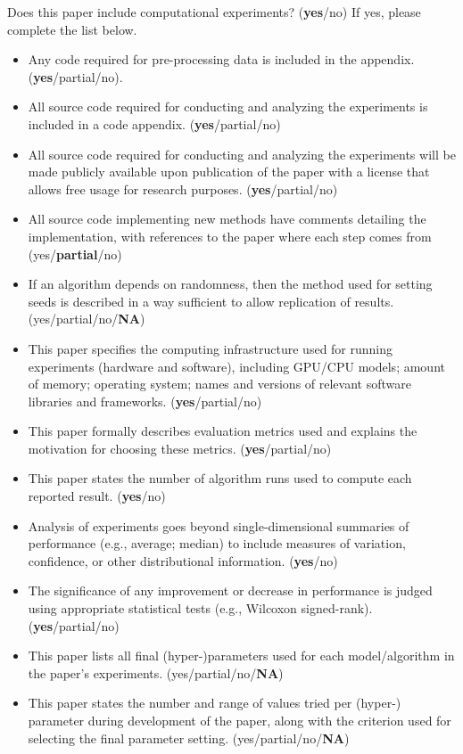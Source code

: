 \documentclass[letterpaper]{article} %
\theoremstyle{remark}
\theoremstyle{definition}
\begin{document}
Does this paper include computational experiments? (\textbf{yes}/no) If yes,
please complete the list below.

\begin{itemize}
  \item Any code required for pre-processing data is included in the appendix.
        (\textbf{yes}/partial/no).
  \item All source code required for conducting and analyzing the experiments is
        included in a code appendix. (\textbf{yes}/partial/no)
  \item All source code required for conducting and analyzing the experiments
        will be made publicly available upon publication of the paper with a
        license that allows free usage for research purposes.
        (\textbf{yes}/partial/no)
  \item All source code implementing new methods have comments detailing the
        implementation, with references to the paper where each step comes from
        (yes/\textbf{partial}/no)
  \item If an algorithm depends on randomness, then the method used for setting
        seeds is described in a way sufficient to allow replication of results.
        (yes/partial/no/\textbf{NA})
  \item This paper specifies the computing infrastructure used for running
        experiments (hardware and software), including GPU/CPU models; amount of
        memory; operating system; names and versions of relevant software
        libraries and frameworks. (\textbf{yes}/partial/no)
  \item This paper formally describes evaluation metrics used and explains the
        motivation for choosing these metrics. (\textbf{yes}/partial/no)
  \item This paper states the number of algorithm runs used to compute each
        reported result. (\textbf{yes}/no)
  \item Analysis of experiments goes beyond single-dimensional summaries of
        performance (e.g., average; median) to include measures of variation,
        confidence, or other distributional information. (\textbf{yes}/no)
  \item The significance of any improvement or decrease in performance is judged
        using appropriate statistical tests (e.g., Wilcoxon signed-rank).
        (\textbf{yes}/partial/no)
  \item This paper lists all final (hyper-)parameters used for each
        model/algorithm in the paper’s experiments. (yes/partial/no/\textbf{NA})
  \item This paper states the number and range of values tried per (hyper-)
        parameter during development of the paper, along with the criterion used
        for selecting the final parameter setting. (yes/partial/no/\textbf{NA})
\end{itemize}
\end{document}
